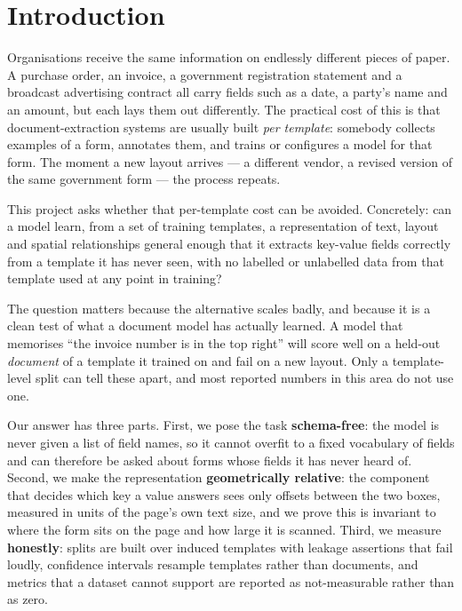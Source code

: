 \documentclass[11pt,a4paper]{article}
\begin{document}
\section{Introduction}

Organisations receive the same information on endlessly different pieces of paper. A purchase
order, an invoice, a government registration statement and a broadcast advertising contract all
carry fields such as a date, a party's name and an amount, but each lays them out differently.
The practical cost of this is that document-extraction systems are usually built
\emph{per template}: somebody collects examples of a form, annotates them, and trains or
configures a model for that form. The moment a new layout arrives --- a different vendor, a
revised version of the same government form --- the process repeats.

This project asks whether that per-template cost can be avoided. Concretely: can a model learn,
from a set of training templates, a representation of text, layout and spatial relationships
general enough that it extracts key-value fields correctly from a template it has never seen,
with no labelled or unlabelled data from that template used at any point in training?

The question matters because the alternative scales badly, and because it is a clean test of
what a document model has actually learned. A model that memorises ``the invoice number is in
the top right'' will score well on a held-out \emph{document} of a template it trained on and
fail on a new layout. Only a template-level split can tell these apart, and most reported
numbers in this area do not use one.

Our answer has three parts. First, we pose the task \textbf{schema-free}: the model is never
given a list of field names, so it cannot overfit to a fixed vocabulary of fields and can
therefore be asked about forms whose fields it has never heard of. Second, we make the
representation \textbf{geometrically relative}: the component that decides which key a value
answers sees only offsets between the two boxes, measured in units of the page's own text size,
and we prove this is invariant to where the form sits on the page and how large it is scanned.
Third, we measure \textbf{honestly}: splits are built over induced templates with leakage
assertions that fail loudly, confidence intervals resample templates rather than documents, and
metrics that a dataset cannot support are reported as not-measurable rather than as zero.
\end{document}
